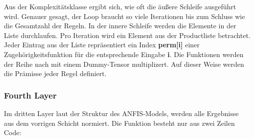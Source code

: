     Aus der Komplexitätsklasse ergibt sich, wie oft die äußere Schleife
ausgeführt wird. Genauer gesagt, der Loop braucht so viele Iterationen
bis zum Schluss wie die Gesamtzahl der Regeln. In der innere Schleife
werden die Elemente in der Liste durchlaufen. Pro Iteration wird ein
Element aus der Productliste betrachtet. Jeder Eintrag aus der Liste
repräsentiert ein Index \textbf{perm{[}i{]}} einer
Zugehörigkeitsfunktion für die entsprechende Eingabe \textbf{i}. Die
Funktionen werden der Reihe nach mit einem Dummy-Tensor multiplizert.
Auf dieser Weise werden die Prämisse jeder Regel definiert.

    \hypertarget{fourth-layer}{%
\subsubsection{Fourth Layer}\label{fourth-layer}}

Im dritten Layer laut der Struktur des ANFIS-Models, werden alle
Ergebnisse aus dem vorrigen Schicht normiert. Die Funktion besteht nur
aus zwei Zeilen Code:


